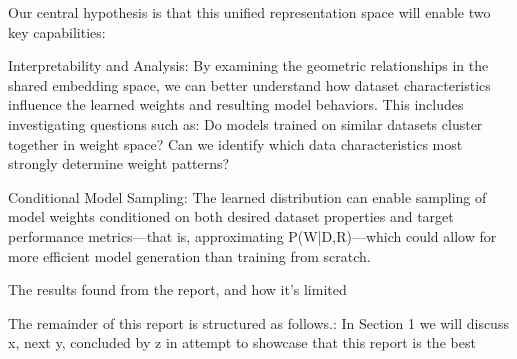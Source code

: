 
Our central hypothesis is that this unified representation space will enable two key capabilities:

Interpretability and Analysis: By examining the geometric relationships in the shared embedding space, we can better understand how dataset characteristics influence the learned weights and resulting model behaviors. This includes investigating questions such as: Do models trained on similar datasets cluster together in weight space? Can we identify which data characteristics most strongly determine weight patterns? 

Conditional Model Sampling: The learned distribution can enable sampling of model weights conditioned on both desired dataset properties and target performance metrics—that is, approximating P(W|D,R)—which could allow for more efficient model generation than training from scratch.







The results found from the report, and how it's limited 

The remainder of this report is structured as follows.:
    In Section 1 we will discuss x, next y, concluded by z in attempt to showcase that this report is the best






